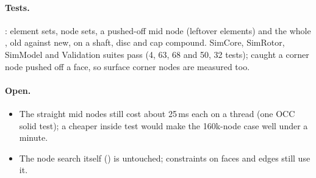\paragraph{Tests.} : element sets, node sets, a pushed-off mid node (leftover elements) and
the whole , old against new, on a shaft, disc and cap compound. SimCore, SimRotor, SimModel and Validation
suites pass (4, 63, 68 and 50, 32 tests);  caught a corner node pushed off a face, so surface corner nodes are measured too.

\paragraph{Open.}
\begin{itemize}[nosep]
  \item The straight mid nodes still cost about 25\,ms each on a thread (one OCC solid test); a cheaper inside test would
        make the 160k-node case well under a minute.
  \item The node search itself () is untouched; constraints on faces and edges still use it.
\end{itemize}
